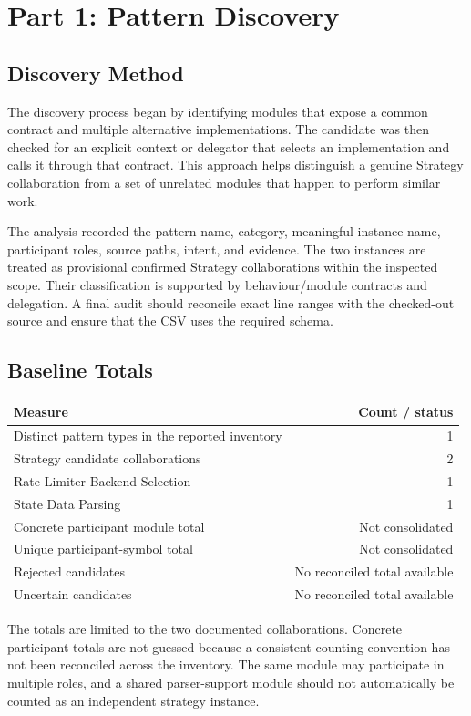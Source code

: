 \documentclass[11pt,a4paper]{article}
\begin{document}
\section{Part 1: Pattern Discovery}
\subsection{Discovery Method}
The discovery process began by identifying modules that expose a common contract and multiple alternative implementations. The candidate was then checked for an explicit context or delegator that selects an implementation and calls it through that contract. This approach helps distinguish a genuine Strategy collaboration from a set of unrelated modules that happen to perform similar work.

The analysis recorded the pattern name, category, meaningful instance name, participant roles, source paths, intent, and evidence. The two instances are treated as provisional confirmed Strategy collaborations within the inspected scope. Their classification is supported by behaviour/module contracts and delegation. A final audit should reconcile exact line ranges with the checked-out source and ensure that the CSV uses the required schema.

\subsection{Baseline Totals}
\begin{center}
\begin{tabularx}{0.92\linewidth}{@{}Xr@{}}
\toprule Measure & Count / status\\ \midrule
Distinct pattern types in the reported inventory & 1\\
Strategy candidate collaborations & 2\\
Rate Limiter Backend Selection & 1\\
State Data Parsing & 1\\
Concrete participant module total & Not consolidated\\
Unique participant-symbol total & Not consolidated\\
Rejected candidates & No reconciled total available\\
Uncertain candidates & No reconciled total available\\
\bottomrule
\end{tabularx}
\end{center}
The totals are limited to the two documented collaborations. Concrete participant totals are not guessed because a consistent counting convention has not been reconciled across the inventory. The same module may participate in multiple roles, and a shared parser-support module should not automatically be counted as an independent strategy instance.
\end{document}

